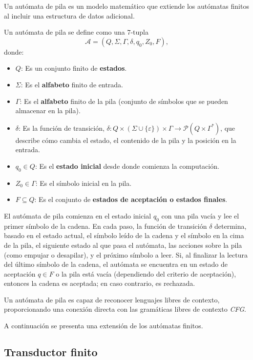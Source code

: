 \documentclass[12pt]{article}
\begin{document}
Un autómata de pila \cite{authomataTheory} es un modelo matemático que extiende los autómatas finitos al incluir una estructura de datos adicional. 

Un autómata de pila se define como una 7-tupla
\[
      \mathcal{A} = (Q, \Sigma, \Gamma, \delta, q_0, Z_0, F),
\]
donde:

\begin{itemize}
      \item $Q$: Es un conjunto finito de \textbf{estados}.
      \item $\Sigma$: Es el \textbf{alfabeto} finito de entrada.
      \item $\Gamma$: Es el \textbf{alfabeto} finito de la pila (conjunto de símbolos que se pueden almacenar en la pila).
      \item $\delta$: Es la función de transición, $\delta: Q \times (\Sigma \cup \{\varepsilon\}) \times \Gamma \to \mathcal{P}(Q \times \Gamma^*)$, que describe cómo cambia el estado, el contenido de la pila y la posición en la entrada.
      \item $q_0 \in Q$: Es el \textbf{estado inicial} desde donde comienza la computación.
      \item $Z_0 \in \Gamma$: Es el símbolo inicial en la pila.
      \item $F \subseteq Q$: Es el conjunto de \textbf{estados de aceptación o estados finales}.
\end{itemize}

El autómata de pila comienza en el estado inicial $q_0$ con una pila vacía y lee el primer símbolo de la cadena.
En cada paso, la función de transición $\delta$ determina, basado en el estado actual, el símbolo leído de la cadena y el símbolo en la cima de la pila, el siguiente estado al que pasa el autómata, las acciones sobre la pila (como empujar o desapilar), y el próximo símbolo a leer.
Si, al finalizar la lectura del último símbolo de la cadena, el autómata se encuentra en un estado de aceptación $q \in F$ o la pila está vacía (dependiendo del criterio de aceptación), entonces la cadena es aceptada; en caso contrario, es rechazada.

Un autómata de pila es capaz de reconocer lenguajes libres de contexto, proporcionando una conexión directa con las gramáticas libres de contexto \textit{CFG}.

A continuación se presenta una extensión de los autómatas finitos.

\subsection{Transductor finito}
\end{document}
